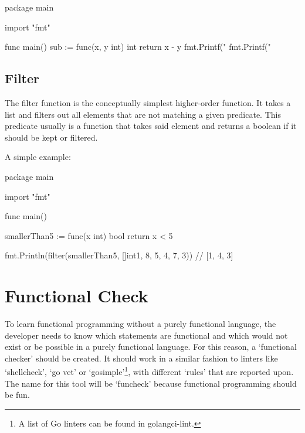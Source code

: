 \begin{code}
    \label{code:fold-go}
\begin{gocode}
package main

import "fmt"

func main() {
  sub := func(x, y int) int { return x - y }
  fmt.Printf("%
  fmt.Printf("%
}
\end{gocode}
\end{code}

\subsection{Filter}

The filter function is the conceptually simplest higher-order function.
It takes a list and filters out all elements that are not matching
a given predicate.
This predicate usually is a function that takes said element and returns
a boolean if it should be kept or filtered.

A simple example:

\begin{code}
    \label{code:filter-go}
    \begin{gocode}
package main

import "fmt"

func main() {
  smallerThan5 := func(x int) bool {
    return x < 5
  }

  fmt.Println(filter(smallerThan5, []int{1, 8, 5, 4, 7, 3})) // [1, 4, 3]
}
\end{gocode}
\end{code}

\section{Functional Check}

To learn functional programming without a purely functional language, the
developer needs to know which statements are functional and which
would not exist or be possible in a purely functional language.
For this reason, a `functional checker' should be created. It should work
in a similar fashion to linters like `shellcheck', `go vet' or `gosimple'\footnote{
    A list of Go linters can be found in golangci-lint\autocite{golangci-lint}.
}, with different `rules' that are reported upon. The name for this tool
will be `funcheck' because functional programming should be fun. %

